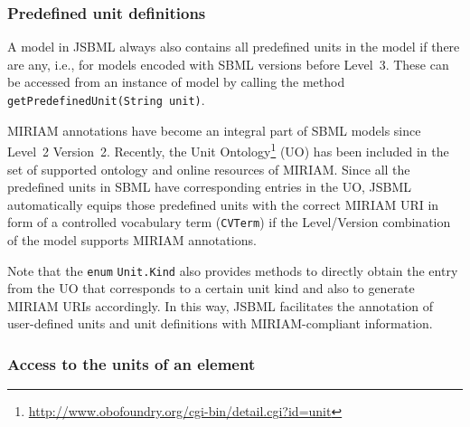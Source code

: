 \subsubsection{Predefined unit definitions}

A model in JSBML
%
always also contains all predefined units in the model
if there are any, i.e., for models encoded with SBML versions before Level~3.
%
These can be accessed from an instance of model by calling the method
\texttt{getPredefinedUnit(String unit)}.

MIRIAM annotations \citep{Novere2005} have become an integral part of SBML models
since Level~2 Version~2. Recently, the Unit
Ontology\footnote{\url{http://www.obofoundry.org/cgi-bin/detail.cgi?id=unit}}
%
(UO) has been included in the set of supported ontology and online resources of
MIRIAM. Since all the predefined units in SBML have corresponding entries in the
UO, JSBML
%
automatically equips those predefined units with the correct MIRIAM
URI in form of a controlled vocabulary term (\texttt{CVTerm}) if the
Level/Version combination of the model supports MIRIAM annotations.

Note that the \texttt{enum} \texttt{Unit.Kind}
%
also provides methods to directly obtain the entry from the UO that corresponds
to a certain unit kind and also to generate MIRIAM URIs accordingly. In this
way, JSBML facilitates the annotation of user-defined units and unit definitions
with MIRIAM-compliant information.

\subsubsection{Access to the units of an element}

